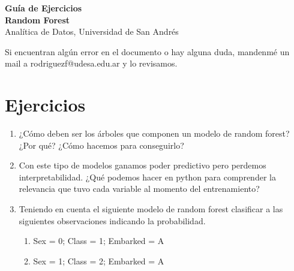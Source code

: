 \documentclass[12pt]{article}
\begin{document}
\begin{center}
  {\LARGE \textbf{Guía de Ejercicios\\Random Forest}}\\[0.5em]
  {Analítica de Datos, Universidad de San Andrés}
\end{center}

Si encuentran algún error en el documento o hay alguna duda, mandenmé un mail a rodriguezf@udesa.edu.ar y lo revisamos.

\section*{Ejercicios}

\begin{enumerate}
    \item ¿Cómo deben ser los árboles que componen un modelo de random forest? ¿Por qué? ¿Cómo hacemos para conseguirlo?

    \item Con este tipo de modelos ganamos poder predictivo pero perdemos interpretabilidad. ¿Qué podemos hacer en python para comprender la relevancia que tuvo cada variable al momento del entrenamiento?

    \item Teniendo en cuenta el siguiente modelo de random forest clasificar a las siguientes observaciones indicando la probabilidad.
    \begin{enumerate}
        \item Sex = 0; Class = 1; Embarked = A
        \item Sex = 1; Class = 2; Embarked = A
    \end{enumerate}

    \begin{center}
\end{center}
\end{enumerate}
\end{document}
